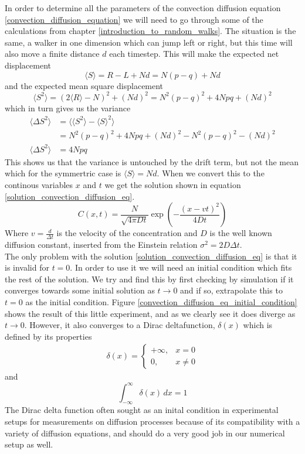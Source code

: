 In order to determine all the parameters of the convection diffusion equation \ref{convection_diffusion_equation} we will need to go through some of the calculations from chapter \ref{introduction_to_random_walks}. 
The situation is the same, a walker in one dimension which can jump left or right, but this time will also move a finite distance $d$ each timestep. 
This will make the expected net displacement
\begin{equation*}
 \langle S\rangle = R-L +Nd = N(p-q) + Nd
\end{equation*}
and the expected mean square displacement
\begin{equation*}
 \langle S^2\rangle = (2\langle R\rangle -N)^2 +(Nd)^2 = N^2(p-q)^2 +4Npq +(Nd)^2
\end{equation*}
which in turn gives us the variance
\begin{align*}
 \langle \Delta S^2\rangle &= \langle\langle S^2\rangle-\langle S\rangle^2\rangle \\
 &= N^2(p-q)^2 +4Npq +(Nd)^2 - N^2(p-q)^2 -(Nd)^2 \\
\langle \Delta S^2\rangle &= 4Npq
\end{align*}
This shows us that the variance is untouched by the drift term, but not the mean which for the symmertric case is $\langle S\rangle = Nd$. 
When we convert this to the continous variables $x$ and $t$ we get the solution shown in equation \ref{solution_convection_diffusion_eq}.
\begin{equation}\label{solution_convection_diffusion_eq}
 C(x,t) = \frac{N}{\sqrt{4\pi Dt}}\exp\left(-\frac{(x-vt)^2}{4Dt}\right)
\end{equation}
Where $v = \frac{d}{\Delta t}$ is the velocity of the concentration and $D$ is the well known diffusion constant, inserted from the Einstein relation $\sigma^2 = 2D\Delta t$.\\
The only problem with the solution \ref{solution_convection_diffusion_eq} is that it is invalid for $t=0$. 
In order to use it we will need an initial condition which fits the rest of the solution. 
We try and find this by first checking by simulation if it converges towards some initial solution as $t\to0$ and if so, extrapolate this to $t=0$ as the initial condition. 
Figure \ref{convection_diffusion_eq_initial_condition} shows the result of this little experiment, and as we clearly see it does diverge as $t\to0$. 
However, it also converges to a Dirac deltafunction, $\delta(x)$ which is defined by its properties
\begin{align*}
\delta(x) = \begin{cases} +\infty, & x = 0 \\ 0, & x \ne 0 \end{cases}
\end{align*}
and
\begin{equation*}
 \int_{-\infty}^\infty \delta(x) \, dx = 1
\end{equation*}
The Dirac delta function often sought as an inital condition in experimental setups for measurements on diffusion processes because of its compatibility with a variety of diffusion equations, and should do a very good job in our numerical setup as well. 


